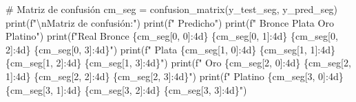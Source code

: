 \documentclass[
  doc,
  floatsintext,
  longtable,
  a4paper,
  nolmodern,
  notxfonts,
  notimes,
  12pt,
  colorlinks=true,linkcolor=blue,citecolor=blue,urlcolor=blue]{apa7}
\newenvironment{Shaded}{\begin{snugshade}}{\end{snugshade}}
\newcommand{\BuiltInTok}[1]{\textcolor[rgb]{0.00,0.23,0.31}{#1}}
\newcommand{\CharTok}[1]{\textcolor[rgb]{0.13,0.47,0.30}{#1}}
\newcommand{\CommentTok}[1]{\textcolor[rgb]{0.37,0.37,0.37}{#1}}
\newcommand{\DecValTok}[1]{\textcolor[rgb]{0.68,0.00,0.00}{#1}}
\newcommand{\NormalTok}[1]{\textcolor[rgb]{0.00,0.23,0.31}{#1}}
\newcommand{\OperatorTok}[1]{\textcolor[rgb]{0.37,0.37,0.37}{#1}}
\newcommand{\SpecialCharTok}[1]{\textcolor[rgb]{0.37,0.37,0.37}{#1}}
\newcommand{\SpecialStringTok}[1]{\textcolor[rgb]{0.13,0.47,0.30}{#1}}
\begin{document}
\begin{Shaded}
\begin{Highlighting}[]
\CommentTok{\# Matriz de confusión}
\NormalTok{cm\_seg }\OperatorTok{=}\NormalTok{ confusion\_matrix(y\_test\_seg, y\_pred\_seg)}
\BuiltInTok{print}\NormalTok{(}\SpecialStringTok{f"}\CharTok{\textbackslash{}n}\SpecialStringTok{Matriz de confusión:"}\NormalTok{)}
\BuiltInTok{print}\NormalTok{(}\SpecialStringTok{f"                    Predicho"}\NormalTok{)}
\BuiltInTok{print}\NormalTok{(}\SpecialStringTok{f"             Bronce  Plata   Oro  Platino"}\NormalTok{)}
\BuiltInTok{print}\NormalTok{(}\SpecialStringTok{f"Real Bronce    }\SpecialCharTok{\{}\NormalTok{cm\_seg[}\DecValTok{0}\NormalTok{, }\DecValTok{0}\NormalTok{]}\SpecialCharTok{:4d\}}\SpecialStringTok{   }\SpecialCharTok{\{}\NormalTok{cm\_seg[}\DecValTok{0}\NormalTok{, }\DecValTok{1}\NormalTok{]}\SpecialCharTok{:4d\}}\SpecialStringTok{  }\SpecialCharTok{\{}\NormalTok{cm\_seg[}\DecValTok{0}\NormalTok{, }\DecValTok{2}\NormalTok{]}\SpecialCharTok{:4d\}}\SpecialStringTok{    }\SpecialCharTok{\{}\NormalTok{cm\_seg[}\DecValTok{0}\NormalTok{, }\DecValTok{3}\NormalTok{]}\SpecialCharTok{:4d\}}\SpecialStringTok{"}\NormalTok{)}
\BuiltInTok{print}\NormalTok{(}\SpecialStringTok{f"     Plata     }\SpecialCharTok{\{}\NormalTok{cm\_seg[}\DecValTok{1}\NormalTok{, }\DecValTok{0}\NormalTok{]}\SpecialCharTok{:4d\}}\SpecialStringTok{   }\SpecialCharTok{\{}\NormalTok{cm\_seg[}\DecValTok{1}\NormalTok{, }\DecValTok{1}\NormalTok{]}\SpecialCharTok{:4d\}}\SpecialStringTok{  }\SpecialCharTok{\{}\NormalTok{cm\_seg[}\DecValTok{1}\NormalTok{, }\DecValTok{2}\NormalTok{]}\SpecialCharTok{:4d\}}\SpecialStringTok{    }\SpecialCharTok{\{}\NormalTok{cm\_seg[}\DecValTok{1}\NormalTok{, }\DecValTok{3}\NormalTok{]}\SpecialCharTok{:4d\}}\SpecialStringTok{"}\NormalTok{)}
\BuiltInTok{print}\NormalTok{(}\SpecialStringTok{f"     Oro       }\SpecialCharTok{\{}\NormalTok{cm\_seg[}\DecValTok{2}\NormalTok{, }\DecValTok{0}\NormalTok{]}\SpecialCharTok{:4d\}}\SpecialStringTok{   }\SpecialCharTok{\{}\NormalTok{cm\_seg[}\DecValTok{2}\NormalTok{, }\DecValTok{1}\NormalTok{]}\SpecialCharTok{:4d\}}\SpecialStringTok{  }\SpecialCharTok{\{}\NormalTok{cm\_seg[}\DecValTok{2}\NormalTok{, }\DecValTok{2}\NormalTok{]}\SpecialCharTok{:4d\}}\SpecialStringTok{    }\SpecialCharTok{\{}\NormalTok{cm\_seg[}\DecValTok{2}\NormalTok{, }\DecValTok{3}\NormalTok{]}\SpecialCharTok{:4d\}}\SpecialStringTok{"}\NormalTok{)}
\BuiltInTok{print}\NormalTok{(}\SpecialStringTok{f"     Platino   }\SpecialCharTok{\{}\NormalTok{cm\_seg[}\DecValTok{3}\NormalTok{, }\DecValTok{0}\NormalTok{]}\SpecialCharTok{:4d\}}\SpecialStringTok{   }\SpecialCharTok{\{}\NormalTok{cm\_seg[}\DecValTok{3}\NormalTok{, }\DecValTok{1}\NormalTok{]}\SpecialCharTok{:4d\}}\SpecialStringTok{  }\SpecialCharTok{\{}\NormalTok{cm\_seg[}\DecValTok{3}\NormalTok{, }\DecValTok{2}\NormalTok{]}\SpecialCharTok{:4d\}}\SpecialStringTok{    }\SpecialCharTok{\{}\NormalTok{cm\_seg[}\DecValTok{3}\NormalTok{, }\DecValTok{3}\NormalTok{]}\SpecialCharTok{:4d\}}\SpecialStringTok{"}\NormalTok{)}


\end{Highlighting}
\end{Shaded}
\end{document}
